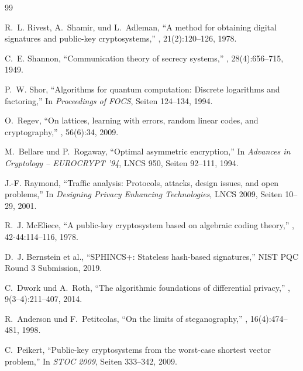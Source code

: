 ﻿\documentclass[12pt, a4paper]{article}
\theoremstyle{plain}
\theoremstyle{definition}
\theoremstyle{remark}
\begin{document}

\begin{thebibliography}{99}

R.~L. Rivest, A.~Shamir, und L.~Adleman,
\newblock ``A method for obtaining digital signatures and public-key cryptosystems,''
, 21(2):120--126, 1978.

C.~E. Shannon,
\newblock ``Communication theory of secrecy systems,''
, 28(4):656--715, 1949.

P.~W. Shor,
\newblock ``Algorithms for quantum computation: Discrete logarithms and factoring,''
\newblock In {\em Proceedings of FOCS}, Seiten 124--134, 1994.

O.~Regev,
\newblock ``On lattices, learning with errors, random linear codes, and cryptography,''
, 56(6):34, 2009.

M.~Bellare und P.~Rogaway,
\newblock ``Optimal asymmetric encryption,''
\newblock In {\em Advances in Cryptology -- EUROCRYPT '94}, LNCS 950, Seiten 92--111, 1994.

J.-F. Raymond,
\newblock ``Traffic analysis: Protocols, attacks, design issues, and open problems,''
\newblock In {\em Designing Privacy Enhancing Technologies}, LNCS 2009, Seiten 10--29, 2001.

R.~J. McEliece,
\newblock ``A public-key cryptosystem based on algebraic coding theory,''
, 42-44:114--116, 1978.

D.~J. Bernstein et al.,
\newblock ``SPHINCS+: Stateless hash-based signatures,''
\newblock NIST PQC Round 3 Submission, 2019.

C.~Dwork und A.~Roth,
\newblock ``The algorithmic foundations of differential privacy,''
, 9(3--4):211--407, 2014.

R.~Anderson und F.~Petitcolas,
\newblock ``On the limits of steganography,''
, 16(4):474--481, 1998.

C.~Peikert,
\newblock ``Public-key cryptosystems from the worst-case shortest vector problem,''
\newblock In {\em STOC 2009}, Seiten 333--342, 2009.


\end{thebibliography}
\end{document}
